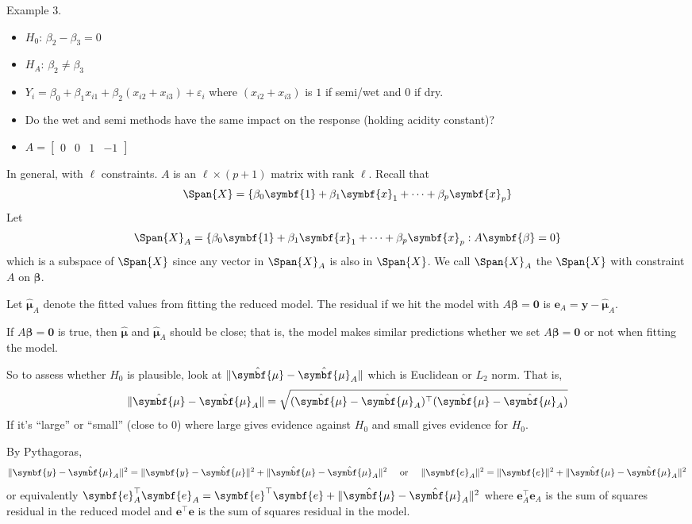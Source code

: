 \begin{Example}{}{}
\begin{itemize}
    \end{itemize}
    Example 3.
    \begin{itemize}
        \item $ H_0 $: $ \beta_2-\beta_3=0 $
        \item $ H_A $: $ \beta_2\neq \beta_3 $
        \item $ Y_i=\beta_0+\beta_1x_{i1}+\beta_2(x_{i2}+x_{i3})+\varepsilon_i $
              where $ (x_{i2}+x_{i3}) $ is
              $ 1 $ if semi/wet and $ 0 $ if dry.
        \item Do the wet and semi methods have the same impact
              on the response (holding acidity constant)?
        \item $ A=\begin{bmatrix}
                      0 & 0 & 1 & -1
                  \end{bmatrix} $
    \end{itemize}
\end{Example}

In general, with $ \ell $ constraints. $ A $
is an $ \ell \times (p+1) $ matrix
with rank $ \ell $. Recall
that
\[ \Span{X}=\set{\beta_0\symbf{1}+\beta_1\symbf{x}_1+
        \cdots+\beta_p\symbf{x}_p} \]
Let
\[ \Span{X}_A=\set{\beta_0\symbf{1}+\beta_1\symbf{x}_1+
        \cdots+\beta_p\symbf{x}_p:A\symbf{\beta}=0} \]
which is a subspace of $ \Span{X} $
since any vector in $ \Span{X}_A $
is also in $ \Span{X} $.
We call $ \Span{X}_A $ the
$ \Span{X} $ with constraint $ A $ on $ \symbf{\beta} $.

Let $ \hat{\symbf{\mu}}_A $
denote the fitted values from fitting the reduced model.
The residual if we hit the model with $ A\symbf{\beta}=\symbf{0} $
is $ \symbf{e}_A=\symbf{y}-\hat{\symbf{\mu}}_A $.

If $ A\symbf{\beta}=\symbf{0} $ is true, then
$ \hat{\symbf{\mu}} $ and $ \hat{\symbf{\mu}}_A $ should be close;
that is, the model makes similar predictions whether
we set $ A\symbf{\beta}=\symbf{0} $ or not when fitting the model.

So to assess whether $ H_0 $ is plausible,
look at $ \norm{\hat{\symbf{\mu}}-\hat{\symbf{\mu}}_A} $
which is Euclidean or $ L_2 $ norm. That is,
\[ \norm{\hat{\symbf{\mu}}-\hat{\symbf{\mu}}_A}=
    \sqrt{(\hat{\symbf{\mu}}-\hat{\symbf{\mu}}_A)^\top(\hat{\symbf{\mu}}-\hat{\symbf{\mu}}_A)} \]
If it's ``large'' or ``small'' (close to 0)
where large gives evidence against $ H_0 $
and small gives evidence for $ H_0 $.

By Pythagoras,
\[ \norm{\symbf{y}-\hat{\symbf{\mu}}_A}^2=
    \norm{\symbf{y}-\hat{\symbf{\mu}}}^2+
    \norm{\hat{\symbf{\mu}}-\hat{\symbf{\mu}}_A}^2
    \quad\text{ or }\quad
    \norm{\symbf{e}_A}^2=\norm{\symbf{e}}^2+\norm{\hat{\symbf{\mu}}-
        \hat{\symbf{\mu}}_A
    }^2 \]
or equivalently $ \symbf{e}_A^\top \symbf{e}_A=\symbf{e}^\top \symbf{e}
    +\norm{\hat{\symbf{\mu}}-
        \hat{\symbf{\mu}}_A
    }^2 $
where $ \symbf{e}_A^\top \symbf{e}_A $ is the sum of squares
residual in the reduced model and $ \symbf{e}^\top \symbf{e} $
is the sum of squares residual in the model.

